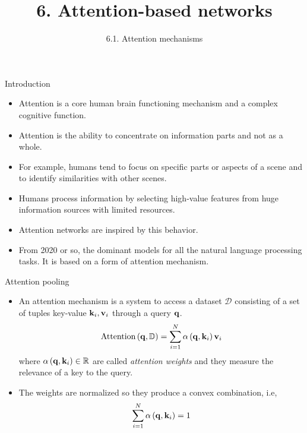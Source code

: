 \documentclass{beamer}
\title{6. Attention-based networks}
\subtitle{6.1. Attention mechanisms}
\begin{document}
\maketitle


\begin{frame}{Introduction}
\begin{itemize}
\item  Attention is a core human brain functioning mechanism and a complex cognitive function.
\item Attention is the ability to concentrate on information parts and not as a whole. 
\item For example, humans tend to focus on specific parts or aspects of a scene and to identify  similarities with other scenes. 
\item Humans process information by selecting high-value features from  huge information sources with limited resources. 
\item Attention networks are inspired by this behavior.
\item From 2020 or so, the dominant models for all the natural language processing tasks. It is based on a form of attention mechanism.  
\end{itemize}
\end{frame}

\begin{frame}{Attention pooling}
\begin{itemize}
    \item An attention mechanism is a system to access a dataset $\mathcal{D}$ consisting of a set of tuples key-value ${\bf k}_i, {\bf v}_i$ through a query ${\bf q}$. 
    \begin{equation}
        \text{Attention}\left({\bf q},\mathbb{D} \right) = \sum_{i=1}^N \alpha\left({\bf q},{\bf k}_i\right) {\bf v}_i
    \end{equation}
    where $\alpha\left({\bf q},{\bf k}_i\right) \in \mathbb{R}$  are called \emph{attention weights} and they measure the relevance of a key to the query. 
    \item The weights are normalized so they produce a convex combination, i.e,
    \begin{equation}
        \sum_{i=1}^N \alpha\left({\bf q},{\bf k}_i\right) = 1
    \end{equation}
\end{itemize}
\end{frame}
\end{document}
